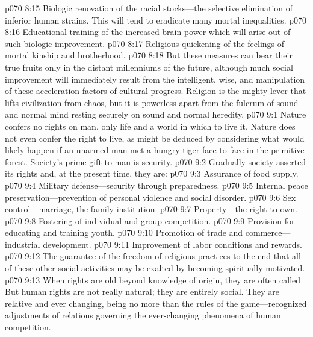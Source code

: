 \pc \vs p070 8:15 \bibnobreakspace Biologic renovation of the racial stocks---the selective elimination of inferior human strains. This will tend to eradicate many mortal inequalities.
\vs p070 8:16 \bibnobreakspace Educational training of the increased brain power which will arise out of such biologic improvement.
\vs p070 8:17 \bibnobreakspace Religious quickening of the feelings of mortal kinship and brotherhood.
\pc \vs p070 8:18 But these measures can bear their true fruits only in the distant millenniums of the future, although much social improvement will immediately result from the intelligent, wise, and  manipulation of these acceleration factors of cultural progress. Religion is the mighty lever that lifts civilization from chaos, but it is powerless apart from the fulcrum of sound and normal mind resting securely on sound and normal heredity.
\vs p070 9:1 Nature confers no rights on man, only life and a world in which to live it. Nature does not even confer the right to live, as might be deduced by considering what would likely happen if an unarmed man met a hungry tiger face to face in the primitive forest. Society’s prime gift to man is security.
\pc \vs p070 9:2 Gradually society asserted its rights and, at the present time, they are:
\pc \vs p070 9:3 \bibnobreakspace Assurance of food supply.
\vs p070 9:4 \bibnobreakspace Military defense---security through preparedness.
\vs p070 9:5 \bibnobreakspace Internal peace preservation---pre\-ven\-tion of personal violence and social disorder.
\vs p070 9:6 \bibnobreakspace Sex control---marriage, the family institution.
\vs p070 9:7 \bibnobreakspace Property---the right to own.
\vs p070 9:8 \bibnobreakspace Fostering of individual and group competition.
\vs p070 9:9 \bibnobreakspace Provision for educating and training youth.
\vs p070 9:10 \bibnobreakspace Promotion of trade and commerce---industrial development.
\vs p070 9:11 \bibnobreakspace Improvement of labor conditions and rewards.
\vs p070 9:12 \bibnobreakspace The guarantee of the freedom of religious practices to the end that all of these other social activities may be exalted by becoming spiritually motivated.
\pc \vs p070 9:13 When rights are old beyond knowledge of origin, they are often called  But human rights are not really natural; they are entirely social. They are relative and ever changing, being no more than the rules of the game---recognized adjustments of relations governing the ever\hyp{}changing phenomena of human competition.
